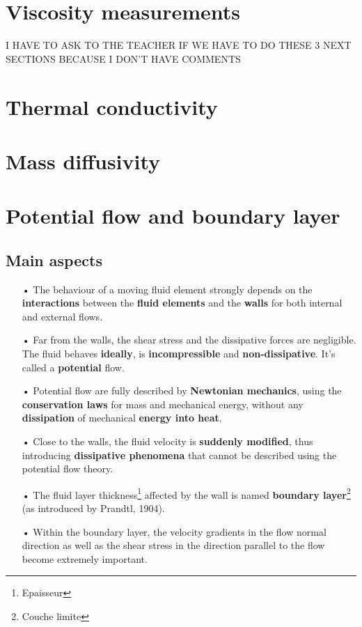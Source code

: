 \section{Viscosity measurements}
I HAVE TO ASK TO THE TEACHER IF WE HAVE TO DO THESE 3 NEXT SECTIONS BECAUSE I DON'T HAVE COMMENTS
	
\section{Thermal conductivity}
\section{Mass diffusivity}

\section{Potential flow and boundary layer}
\subsection{Main aspects}
\begin{itemize}
	\item[•] The behaviour of a moving fluid element strongly depends on the \textbf{interactions} between the \textbf{fluid elements} and the \textbf{walls} for both internal and external flows. \\
	      	
	\item[•] Far from the walls, the shear stress and the dissipative forces are negligible. The fluid behaves \textbf{ideally}, is \textbf{incompressible} and \textbf{non-dissipative}. It's called a \textbf{potential} flow. \\
	      	
	\item[•] Potential flow are fully described by \textbf{Newtonian mechanics}, using the \textbf{conservation laws} for mass and mechanical energy, without any \textbf{dissipation} of mechanical \textbf{energy into heat}. \\
	      	
	\item[•] Close to the walls, the fluid velocity is \textbf{suddenly modified}, thus introducing \textbf{dissipative phenomena} that cannot be described using the potential flow theory.
	      	
	\item[•] The fluid layer thickness\footnote{Epaisseur} affected by the wall is named \textbf{boundary layer}\footnote{Couche limite} (as introduced by Prandtl, 1904).\\
	      	
	\item[•] Within the boundary layer, the velocity gradients in the flow normal direction as well as the shear stress in the direction parallel to the flow become extremely important.
\end{itemize}
	
